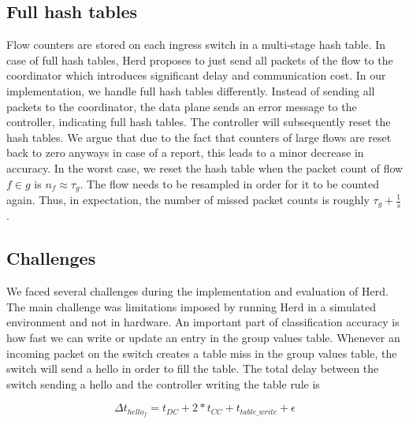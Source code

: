 \documentclass[11pt,oneside,a4paper]{article}
\begin{document}
\subsection{Full hash tables} \label{special}%

Flow counters are stored on each ingress switch in a multi-stage hash table. In case of full hash tables, Herd proposes to just send all packets of the flow to the coordinator which introduces significant delay and communication cost. In our implementation, we handle full hash tables differently. Instead of sending all packets to the coordinator, the data plane sends an error message to the controller, indicating full hash tables. The controller will subsequently reset the hash tables. We argue that due to the fact that counters of large flows are reset back to zero anyways in case of a report, this leads to a minor decrease in accuracy. In the worst case, we reset the hash table when the packet count of flow $f \in g$ is $n_f \approx \tau_g$. The flow needs to be resampled in order for it to be counted again. Thus, in expectation, the number of missed packet counts is roughly $\tau_g+\frac{1}{s}$.

\subsection{Challenges} \label{challenges}

We faced several challenges during the implementation and evaluation of Herd. The main challenge was limitations imposed by running Herd in a simulated environment and not in hardware. An important part of classification accuracy is how fast we can write or update an entry in the group values table. Whenever an incoming packet on the switch creates a table miss in the group values table, the switch will send a hello in order to fill the table. The total delay between the switch sending a hello and the controller writing the table rule is

$$\Delta t_{hello_f} = t_{DC} + 2*t_{CC} + t_{table\_write} + \epsilon$$
\end{document}

